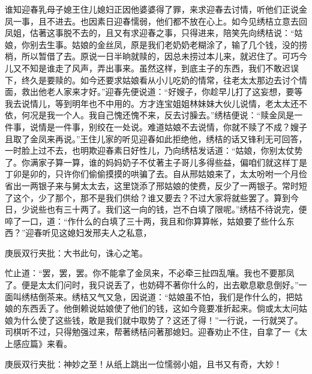\begin{parag}


    谁知迎春乳母子媳王住儿媳妇正因他婆婆得了罪，来求迎春去讨情，听他们正说金凤一事，且不进去。也因素日迎春懦弱，他们都不放在心上。如今见绣桔立意去回凤姐，估著这事脱不去的，且又有求迎春之事，只得进来，陪笑先向绣桔说：“姑娘，你别去生事。姑娘的金丝凤，原是我们老奶奶老糊涂了，输了几个钱，没的捞梢，所以暂借了去。原说一日半晌就赎的，因总未捞过本儿来，就迟住了。可巧今儿又不知是谁走了风声，弄出事来。虽然这样，到底主子的东西，我们不敢迟误下，终久是要赎的。如今还要求姑娘看从小儿吃奶的情常，往老太太那边去讨个情面，救出他老人家来才好。”迎春先便说道：“好嫂子，你趁早儿打了这妄想，要等我去说情儿，等到明年也不中用的。方才连宝姐姐林妹妹大伙儿说情，老太太还不依，何况是我一个人。我自己愧还愧不来，反去讨臊去。”绣桔便说：“赎金凤是一件事，说情是一件事，别绞在一处说。难道姑娘不去说情，你就不赎了不成？嫂子且取了金凤来再说。”王住儿家的听见迎春如此拒绝他，绣桔的话又锋利无可回答，一时脸上过不去，也明欺迎春素日好性儿，乃向绣桔发话道：“姑娘，你别太仗势了。你满家子算一算，谁的妈妈奶子不仗著主子哥儿多得些益，偏咱们就这样丁是丁卯是卯的，只许你们偷偷摸摸的哄骗了去。自从邢姑娘来了，太太吩咐一个月俭省出一两银子来与舅太太去，这里饶添了邢姑娘的使费，反少了一两银子。常时短了这个，少了那个，那不是我们供给？谁又要去？不过大家将就些罢了。算到今日，少说些也有三十两了。我们这一向的钱，岂不白填了限呢。”绣桔不待说完，便啐了一口，道：“作什么的白填了三十两，我且和你算算帐，姑娘要了些什么东西？”迎春听见这媳妇发邢夫人之私意，\begin{note}庚辰双行夹批：大书此句，诛心之笔。\end{note}忙止道：“罢，罢，罢。你不能拿了金凤来，不必牵三扯四乱嚷。我也不要那凤了。便是太太们问时，我只说丢了，也妨碍不著你什么的，出去歇息歇息倒好。”一面叫绣桔倒茶来。绣桔又气又急，因说道：“姑娘虽不怕，我们是作什么的，把姑娘的东西丢了。他倒赖说姑娘使了他们的钱，这如今竟要准折起来。倘或太太问姑娘为什么使了这些钱，敢是我们就中取势了？这还了得！”一行说，一行就哭了。司棋听不过，只得勉强过来，帮著绣桔问著那媳妇。迎春劝止不住，自拿了一《太上感应篇》来看。\begin{note}庚辰双行夹批：神妙之至！从纸上跳出一位懦弱小姐，且书又有奇，大妙！\end{note}
\end{parag}


